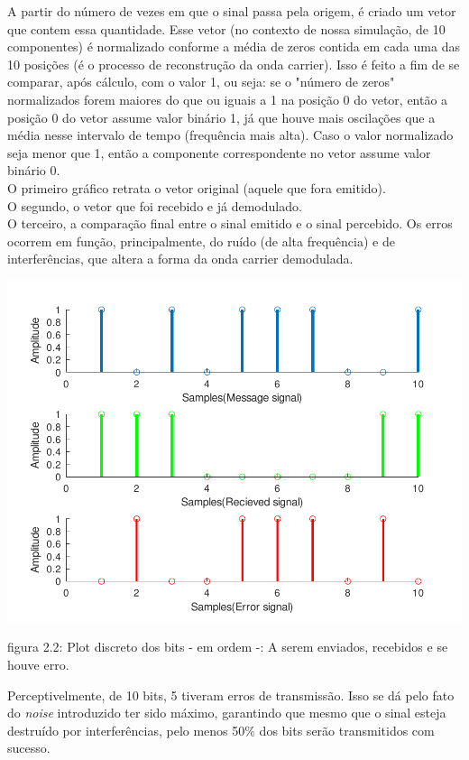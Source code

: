 \documentclass[11pt,a4paper]{report}
\begin{document}
		A partir do número de vezes em que o sinal passa pela origem, é criado um vetor que contem essa quantidade. Esse vetor (no contexto de nossa simulação, de 10 componentes) é normalizado conforme a média de zeros contida em cada uma das 10 posições (é o processo de reconstrução da onda carrier). Isso é feito a fim de se comparar, após cálculo, com o valor 1, ou seja: se o "número de zeros" normalizados forem maiores do que ou iguais a 1 na posição 0 do vetor, então a posição 0 do vetor assume valor binário 1, já que houve mais oscilações que a média nesse intervalo de tempo (frequência mais alta). Caso o valor normalizado seja menor que 1, então a componente correspondente no vetor assume valor binário 0.\\
		
		O primeiro gráfico retrata o vetor original (aquele que fora emitido).\\
		
		O segundo, o vetor que foi recebido e já demodulado.\\
		
		O terceiro, a comparação final entre o sinal emitido e o sinal percebido. Os erros ocorrem em função, principalmente, do ruído (de alta frequência) e de interferências, que altera a forma da onda carrier demodulada.
		
\begin{center}
	\includegraphics[clip, trim=0.0cm 0cm 0.0cm 0.0cm, 								width=1.00\textwidth]{sinais_comp}
\end{center}
\begin{center}
	{\footnotesize figura 2.2: Plot discreto dos bits - em ordem -: A serem enviados, recebidos e se houve erro.}
\end{center}
	Perceptivelmente, de 10 bits, 5 tiveram erros de transmissão. Isso se dá pelo fato do {\it noise} introduzido ter sido máximo, garantindo que mesmo que o sinal esteja destruído por interferências, pelo menos 50\% dos bits serão transmitidos com sucesso.\\
		
\end{document}
